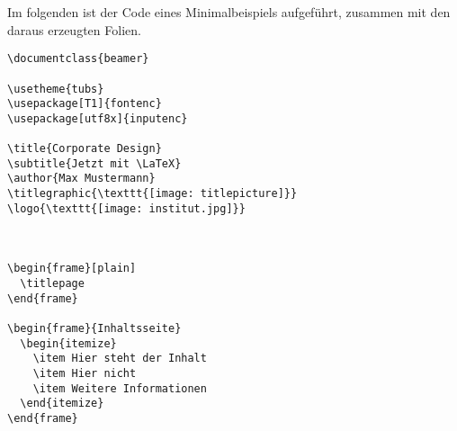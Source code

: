 Im folgenden ist der Code eines Minimalbeispiels aufgeführt, zusammen mit den
daraus erzeugten Folien.

\begin{verbatim}
\documentclass{beamer}

\usetheme{tubs}
\usepackage[T1]{fontenc}
\usepackage[utf8x]{inputenc}

\title{Corporate Design}
\subtitle{Jetzt mit \LaTeX}
\author{Max Mustermann}
\titlegraphic{\texttt{[image: titlepicture]}}
\logo{\texttt{[image: institut.jpg]}}



\begin{frame}[plain]
  \titlepage
\end{frame}

\begin{frame}{Inhaltsseite}
  \begin{itemize}
    \item Hier steht der Inhalt
    \item Hier nicht
    \item Weitere Informationen
  \end{itemize}
\end{frame}


\end{verbatim}

\begin{center}

\end{center}
